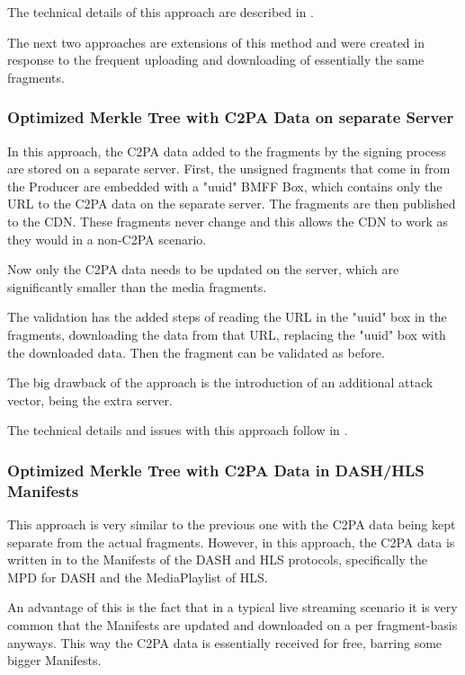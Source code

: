The technical details of this approach are described in .

The next two approaches are extensions of this method and were created in response to the frequent uploading and downloading of essentially the same fragments.

\subsubsection{Optimized Merkle Tree with C2PA Data on separate Server}

In this approach, the C2PA data added to the fragments by the signing process are stored on a separate server. First, the unsigned fragments that come in from the Producer are embedded with a "uuid" BMFF Box, which contains only the URL to the C2PA data on the separate server. The fragments are then published to the CDN. These fragments never change and this allows the CDN to work as they would in a non-C2PA scenario.

Now only the C2PA data needs to be updated on the server, which are significantly smaller than the media fragments.

The validation has the added steps of reading the URL in the "uuid" box in the fragments, downloading the data from that URL, replacing the "uuid" box with the downloaded data. Then the fragment can be validated as before.

The big drawback of the approach is the introduction of an additional attack vector, being the extra server.

The technical details and issues with this approach follow in .

\subsubsection{Optimized Merkle Tree with C2PA Data in DASH/HLS Manifests}

This approach is very similar to the previous one with the C2PA data being kept separate from the actual fragments. However, in this approach, the C2PA data is written in to the Manifests of the DASH and HLS protocols, specifically the MPD for DASH and the MediaPlaylist of HLS.

An advantage of this is the fact that in a typical live streaming scenario it is very common that the Manifests are updated and downloaded on a per fragment-basis anyways. This way the C2PA data is essentially received for free, barring some bigger Manifests.

